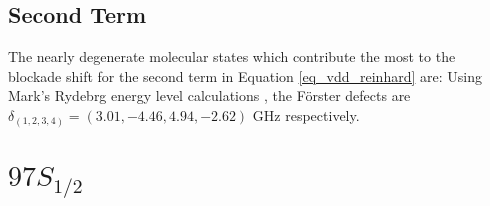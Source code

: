 \subsection{Second Term}
The nearly degenerate molecular states which contribute the most to the blockade shift for the second term in Equation \ref{eq_vdd_reinhard} are:
Using Mark's Rydebrg energy level calculations \cite{}, the F\"{o}rster defects are $\delta_{(1,2,3,4)}=(3.01,-4.46,4.94,-2.62)$ GHz respectively.


\section{$97S_{1/2}$}
